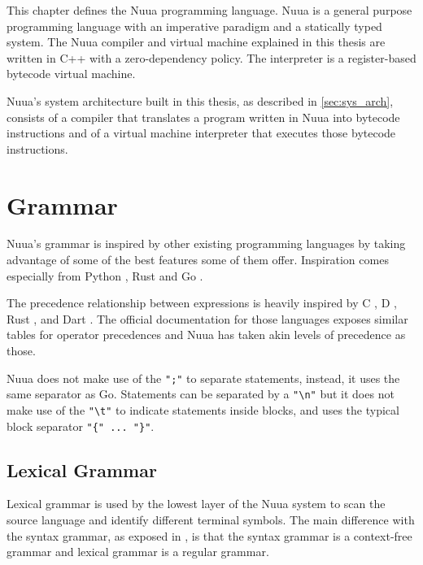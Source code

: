 This chapter defines the Nuua programming language. Nuua is a general purpose programming language with an imperative
paradigm and a statically typed system. The Nuua compiler and virtual machine explained in this thesis are written in C++
with a zero-dependency policy. The interpreter is a register-based bytecode virtual machine.

Nuua's system architecture built in this thesis, as described in \autoref{sec:sys_arch}, consists of a compiler that translates a program written
in Nuua into bytecode instructions and of a virtual machine interpreter that executes those bytecode instructions.

\section{Grammar}
\label{sec:nuua_grammar}

Nuua's grammar is inspired by other existing programming languages by taking advantage of some of the best features some of them offer.
Inspiration comes especially from Python \autocite{python_programming_language}, Rust \autocite{rust_programming_language} and
Go \autocite{go_programming_language}.

The precedence relationship between expressions is heavily inspired by C \autocite{c_programming_language}, D \autocite{d_programming_language},
Rust \autocite{rust_programming_language}, and Dart \autocite{dart_programming_language}. The official documentation for those languages
exposes similar tables for operator precedences and Nuua has taken akin levels of precedence as those.

Nuua does not make use of the \texttt{";"} to separate statements, instead, it uses the same separator as Go. Statements can be separated by
a \texttt{"\textbackslash n"} but it does not make use of the \texttt{"\textbackslash t"} to indicate statements inside blocks, and uses the typical
block separator \texttt{"\{" ... "\}"}.

\subsection{Lexical Grammar}

Lexical grammar is used by the lowest layer of the Nuua system to scan the source language and identify different terminal symbols.
The main difference with the syntax grammar, as exposed in \autocite[Appendix~I]{crafting_interpreters}, is that the syntax grammar is a context-free grammar and lexical grammar is a regular grammar.

